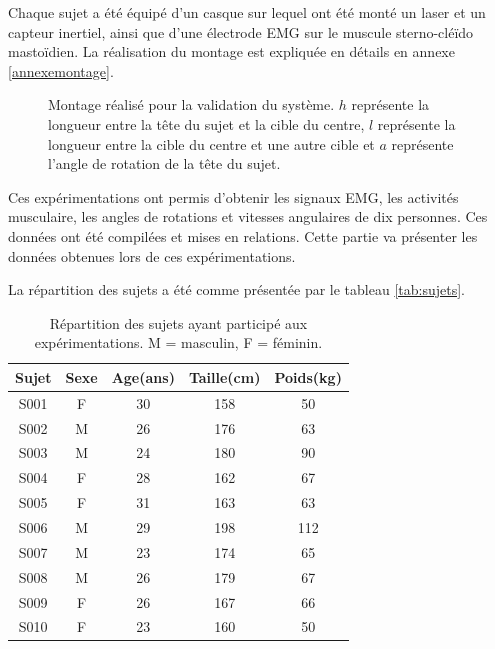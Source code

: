 \documentclass[letterpaper, twoside, 12pt, memoire, creativecommons, hyperref]{thETS}
\begin{document}
Chaque sujet a été équipé d'un casque sur lequel ont été monté un laser et un capteur inertiel, ainsi que d'une électrode EMG sur le muscule sterno-cléïdo mastoïdien. La réalisation du montage est expliquée en détails en annexe \ref{annexemontage}.

\begin{figure}
	\centering
	\caption{Montage réalisé pour la validation du système. $h$ représente la longueur entre la tête du sujet et la cible du centre, $l$ représente la longueur entre la cible du centre et une autre cible et $a$ représente l'angle de rotation de la tête du sujet.}
	\label{fig:sujet}
\end{figure}

Ces expérimentations ont permis d'obtenir les signaux EMG, les activités musculaire, les angles de rotations et vitesses angulaires de dix personnes. Ces données ont été compilées et mises en relations. Cette partie va présenter les données obtenues lors de ces expérimentations.

La répartition des sujets a été comme présentée par le tableau \ref{tab:sujets}.

\begin{table}[ht]
	\caption{Répartition des sujets ayant participé aux expérimentations. M = masculin, F = féminin. }
		\begin{tabular}{|c|c|c|c|c|}
		\hline
			Sujet & Sexe & Age(ans) & Taille(cm) & Poids(kg) \\
	    \hline
	    		S001 & F & 30 & 158 & 50\\
	    \hline
			S002 & M & 26 & 176 & 63\\
	    \hline
	    		S003 & M & 24 & 180 & 90\\
	    \hline
	    		S004 & F & 28 & 162 & 67\\
	    \hline
	    		S005 & F & 31 & 163 & 63\\
	    \hline
	    		S006 & M & 29 & 198 & 112\\
	    \hline
	    		S007 & M & 23 & 174 & 65\\
	    \hline
	    		S008 & M & 26 & 179 & 67\\
	    \hline
	    		S009 & F & 26 & 167 & 66\\
	    \hline
	    		S010 & F & 23 & 160 & 50\\
	    \hline
		\end{tabular}
	\label{tab:effangles}
\end{table}
\end{document}
